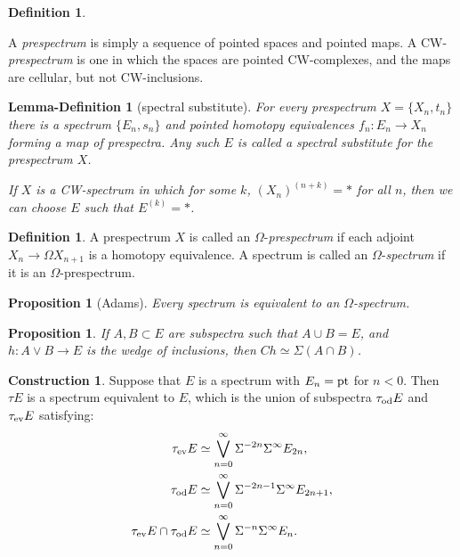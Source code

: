 \documentclass[11pt]{article}
\theoremstyle{plain}
\newtheorem{prop}[thm]{Proposition}
\newtheorem{lemdef}[thm]{Lemma-Definition}
\theoremstyle{definition}
\newtheorem{const}[thm]{Construction}
\newtheorem{defn}[thm]{Definition}
\begin{document}
{\begin{defn}\hfil
\begin{itemise}
\itm A \emph{prespectrum} is simply a sequence of pointed spaces and pointed
maps.
\itm A CW-\emph{prespectrum} is one in which the spaces are pointed
CW-complexes, and the maps are cellular, but not CW-inclusions.
\end{itemise}
\end{defn}
\begin{lemdef}[spectral substitute]
For every prespectrum $X=\{X_n,t_n\}$ there is a spectrum $\{E_n,s_n\}$ and
pointed homotopy equivalences $f_n:E_n\to X_n$ forming a map of prespectra. Any
such $E$ is called a \emph{spectral substitute} for the prespectrum $X$.

If $X$ is a CW-spectrum in which for some $k$, $(X_n)^{(n+k)}=*$ for all $n$,
then we can choose $E$ such that $E^{(k)}=*$.
\end{lemdef}
\begin{defn}
A prespectrum $X$ is called an $\Omega$-\emph{prespectrum} if each adjoint
$X_n\to \Omega X_{n+1}$ is a homotopy equivalence. A spectrum is called an
$\Omega$-\emph{spectrum} if it is an $\Omega$-prespectrum.
\end{defn}
\begin{prop}[Adams]
Every spectrum is equivalent to an $\Omega$-spectrum.
\end{prop}
\begin{prop}
If $A,B\subset E$ are subspectra such that $A\cup B=E$, and $h:A\vee B\to E$ is
the wedge of inclusions, then $Ch\simeq\Sigma(A\cap B)$.
\end{prop}
\begin{const}
Suppose that $E$ is a spectrum with $E_n=\textup{pt}$ for $n<0$. Then $\tau E$
is a spectrum equivalent to $E$, which is the union of subspectra
$\tau_\textup{od}E$ and $\tau_\textup{ev}E$ satisfying:
\begin{alignat*}{2}
\tau_\textup{ev}&E\simeq\bigvee_{n=0}^\infty\Sigma^{-2n}\Sigma^\infty E_{2n},\\
\tau_\textup{od}&
E\simeq\bigvee_{n=0}^\infty\Sigma^{-2n-1}\Sigma^\infty E_{2n+1},\\
\tau_\textup{ev}E\cap\tau_\textup{od}&
E\simeq\bigvee_{n=0}^\infty\Sigma^{-n}\Sigma^\infty E_{n}.
\end{alignat*}
\end{const}
}   %
\end{document}
